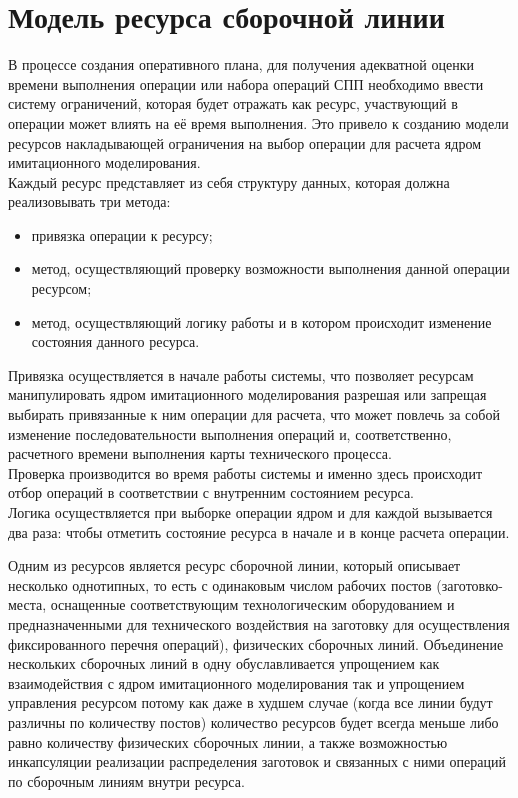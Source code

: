 \section{Модель ресурса сборочной линии}
\indent В процессе создания оперативного плана, для получения адекватной оценки времени выполнения операции или набора операций СПП необходимо ввести систему ограничений, которая будет отражать как ресурс, участвующий в операции может влиять на её время выполнения.
Это привело к созданию модели ресурсов накладывающей ограничения на выбор операции для расчета ядром имитационного моделирования.\\
\indent Каждый ресурс представляет из себя структуру данных, которая должна реализовывать три метода:

\begin{itemize}
	\item привязка операции к ресурсу;
	\item метод, осуществляющий проверку возможности выполнения данной операции ресурсом;
	\item метод, осуществляющий логику работы и в котором происходит изменение состояния данного ресурса.
\end{itemize}

\indent Привязка осуществляется в начале работы системы, что позволяет ресурсам манипулировать ядром имитационного моделирования разрешая или запрещая выбирать привязанные к ним операции для расчета, что может повлечь за собой изменение последовательности выполнения операций и, соответственно, расчетного времени выполнения карты технического процесса.\\
\indent Проверка производится во время работы системы и именно здесь происходит отбор операций в соответствии с внутренним состоянием ресурса.\\
\indent Логика осуществляется при выборке операции ядром и для каждой вызывается два раза: чтобы отметить состояние ресурса в начале и в конце расчета операции.\\


\indent Одним из ресурсов является ресурс сборочной линии, который описывает несколько однотипных, то есть с одинаковым числом рабочих постов (заготовко-места, оснащенные соответствующим технологическим оборудованием и предназначенными для технического воздействия на заготовку для осуществления фиксированного перечня операций), физических сборочных линий.
Объединение нескольких сборочных линий в одну обуславливается упрощением как взаимодействия с ядром имитационного моделирования так и упрощением управления ресурсом потому как даже в худшем случае (когда все линии будут различны по количеству постов) количество ресурсов будет всегда меньше либо равно количеству физических сборочных линии, а также возможностью инкапсуляции реализации распределения заготовок и связанных с ними операций по сборочным линиям внутри ресурса.

